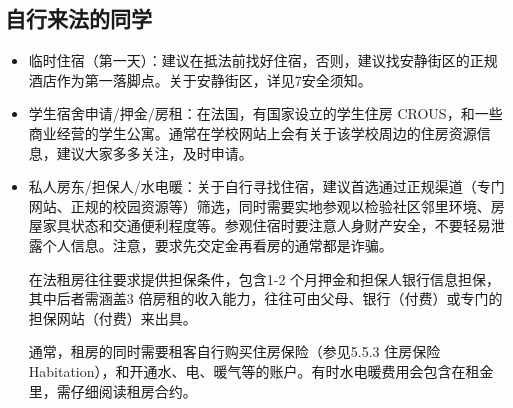 \subsection{自行来法的同学}

\begin{itemize}
    \item 临时住宿（第一天）：建议在抵法前找好住宿，否则，建议找安静街区的正规酒店作为第一落脚点。关于安静街区，详见7安全须知。
    \item 学生宿舍申请/押金/房租：在法国，有国家设立的学生住房 CROUS，和一些商业经营的学生公寓。通常在学校网站上会有关于该学校周边的住房资源信息，建议大家多多关注，及时申请。
    \item 私人房东/担保人/水电暖：关于自行寻找住宿，建议首选通过正规渠道（专门网站、正规的校园资源等）筛选，同时需要实地参观以检验社区邻里环境、房屋家具状态和交通便利程度等。参观住宿时要注意人身财产安全，不要轻易泄露个人信息。注意，要求先交定金再看房的通常都是诈骗。
    
    在法租房往往要求提供担保条件，包含1-2 个月押金和担保人银行信息担保，其中后者需涵盖3 倍房租的收入能力，往往可由父母、银行（付费）或专门的担保网站（付费）来出具。
    
    通常，租房的同时需要租客自行购买住房保险（参见5.5.3 住房保险Habitation），和开通水、电、暖气等的账户。有时水电暖费用会包含在租金里，需仔细阅读租房合约。
\end{itemize}
